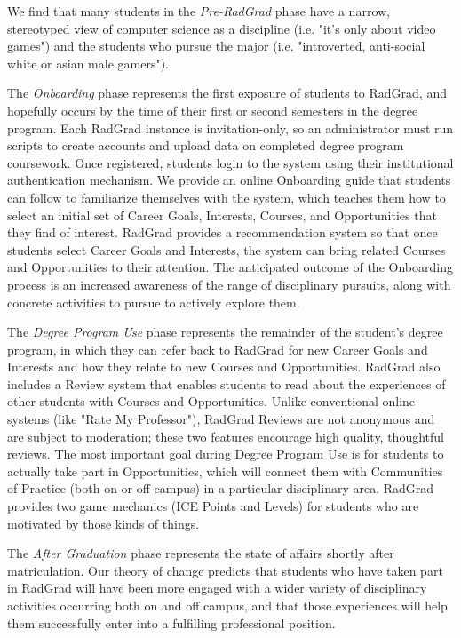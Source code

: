 \documentclass[acmsmall]{acmart}
\begin{document}
We find that many students in the {\em Pre-RadGrad} phase have a narrow, stereotyped view of computer science as a discipline (i.e. "it's only about video games") and the students who pursue the major (i.e. "introverted, anti-social white or asian male gamers").

The {\em Onboarding} phase represents the first exposure of students to RadGrad, and hopefully occurs by the time of their first or second semesters in the degree program. Each RadGrad instance is invitation-only, so an administrator must run scripts to create accounts and upload data on completed degree program coursework. Once registered, students login to the system using their institutional authentication mechanism. We provide an online Onboarding guide \cite{radgrad-student-onboarding-guide} that students can follow to familiarize themselves with the system, which teaches them how to select an initial set of Career Goals, Interests, Courses, and Opportunities that they find of interest. RadGrad provides a recommendation system so that once students select Career Goals and Interests, the system can bring related Courses and Opportunities to their attention.  The anticipated outcome of the Onboarding process is an increased awareness of the range of disciplinary pursuits, along with concrete activities to pursue to actively explore them.

The {\em Degree Program Use} phase represents the remainder of the student's degree program, in which they can refer back to RadGrad for new Career Goals and Interests and how they relate to new Courses and Opportunities. RadGrad also includes a Review system that enables students to read about the experiences of other students with Courses and Opportunities. Unlike conventional online systems (like "Rate My Professor"), RadGrad Reviews are not anonymous and are subject to moderation; these two features encourage high quality, thoughtful reviews.  The most important goal during Degree Program Use is for students to actually take part in Opportunities, which will connect them with Communities of Practice (both on or off-campus) in a particular disciplinary area. RadGrad provides two game mechanics (ICE Points and Levels) for students who are motivated by those kinds of things.

The {\em After Graduation} phase represents the state of affairs shortly after matriculation.  Our theory of change predicts that students who have taken part in RadGrad will have been more engaged with a wider variety of disciplinary activities occurring both on and off campus, and that those experiences will help them successfully enter into a fulfilling professional position.
\end{document}
